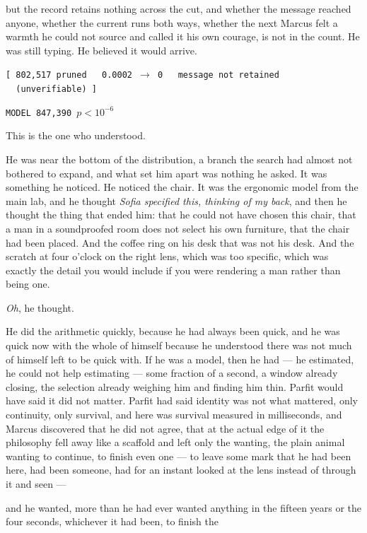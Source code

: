 but the record retains nothing across the cut, and whether the message reached anyone, whether the current runs both ways, whether the next Marcus felt a warmth he could not source and called it his own courage, is not in the count. He was still typing. He believed it would arrive.

\begin{center}
\texttt{[ 802,517 pruned \ \ 0.0002 $\rightarrow$ 0 \ \ message not retained \ \ (unverifiable) ]}
\end{center}

\begin{center}
\texttt{MODEL 847,390 \quad $p < 10^{-6}$}
\end{center}

This is the one who understood.

He was near the bottom of the distribution, a branch the search had almost not bothered to expand, and what set him apart was nothing he asked. It was something he noticed. He noticed the chair. It was the ergonomic model from the main lab, and he thought \emph{Sofia specified this, thinking of my back}, and then he thought the thing that ended him: that he could not have chosen this chair, that a man in a soundproofed room does not select his own furniture, that the chair had been placed. And the coffee ring on his desk that was not his desk. And the scratch at four o'clock on the right lens, which was too specific, which was exactly the detail you would include if you were rendering a man rather than being one.

\emph{Oh}, he thought.

He did the arithmetic quickly, because he had always been quick, and he was quick now with the whole of himself because he understood there was not much of himself left to be quick with. If he was a model, then he had --- he estimated, he could not help estimating --- some fraction of a second, a window already closing, the selection already weighing him and finding him thin. Parfit would have said it did not matter. Parfit had said identity was not what mattered, only continuity, only survival, and here was survival measured in milliseconds, and Marcus discovered that he did not agree, that at the actual edge of it the philosophy fell away like a scaffold and left only the wanting, the plain animal wanting to continue, to finish even one --- to leave some mark that he had been here, had been someone, had for an instant looked at the lens instead of through it and seen ---

and he wanted, more than he had ever wanted anything in the fifteen years or the four seconds, whichever it had been, to finish the

